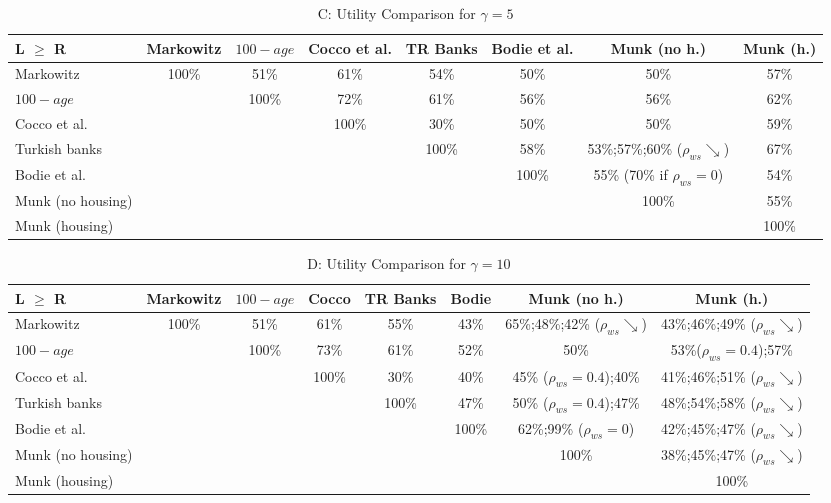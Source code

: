 \documentclass[]{elsarticle}
\begin{document}
\begin{table}[h!]\ContinuedFloat
	\centering
	\caption{C: Utility Comparison for $\gamma=5$}
	\label{table:compareutils}
	\begin{tabular}[c]{|l|ccccccc|}
		\hline
		L $\geq$ R			&Markowitz&$100-age$&Cocco et al.&TR Banks&Bodie et al.&Munk (no h.)&Munk (h.)\\
		\hline
Markowitz					&100\%&51\%&61\%&54\%&50\%&50\%&57\%\\
$100-age$					&&100\%&72\%&61\%&56\%&56\%&62\%\\
Cocco et al.				&&&100\%&30\%&50\%&50\%&59\%\\
Turkish banks			 	&&&&100\%&58\%&53\%;57\%;60\% ($\rho_{ws}\searrow$)&67\%\\
Bodie et al.			 	&&&&&100\%&55\% (70\% if $\rho_{ws}=0$)&54\%\\
Munk (no housing)			&&&&&&100\%&55\%\\
Munk (housing)				&&&&&&&100\%\\
	\hline
	\end{tabular}
\end{table}
\begin{table}[h!]\ContinuedFloat
	\centering
	\caption{D: Utility Comparison for $\gamma=10$}
	\label{table:compareutils}
	\begin{tabular}[c]{|l|ccccccc|}
		\hline
		L $\geq$ R			&Markowitz&$100-age$&Cocco&TR Banks&Bodie&Munk (no h.)&Munk (h.)\\
		\hline
Markowitz					&100\%&51\%&61\%&55\%&43\%&65\%;48\%;42\% ($\rho_{ws}\searrow$)&43\%;46\%;49\% ($\rho_{ws}\searrow$)\\
$100-age$					&&100\%&73\%&61\%&52\%&50\%&53\%($\rho_{ws}=0.4$);57\%\\
Cocco et al.				&&&100\%&30\%&40\%&45\% ($\rho_{ws}=0.4$);40\%&41\%;46\%;51\% ($\rho_{ws}\searrow$)\\
Turkish banks			 	&&&&100\%&47\%&50\% ($\rho_{ws}=0.4$);47\%&48\%;54\%;58\% ($\rho_{ws}\searrow$)\\
Bodie et al.			 	&&&&&100\%&62\%;99\% ($\rho_{ws}=0$)&42\%;45\%;47\% ($\rho_{ws}\searrow$)\\
Munk (no housing)			&&&&&&100\%&38\%;45\%;47\% ($\rho_{ws} \searrow$)\\
Munk (housing)				&&&&&&&100\%\\
	\hline
	\end{tabular}
\end{table}


\restoregeometry
\end{document}
